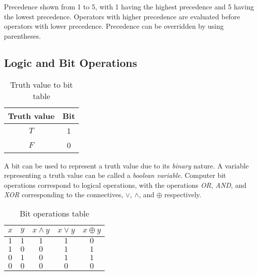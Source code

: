 \documentclass[12pt letter]{report}
\begin{document}
Precedence shown from 1 to 5, with 1 having the highest precedence and 5 having the lowest precedence. Operators with
higher precedence are evaluated before operators with lower precedence. Precedence can be overridden by using parentheses.

\subsection{Logic and Bit Operations}


\begin{table}[h!]
	\caption{Truth value to bit table}\label{tab:bit}
	\begin{center}
		\begin{tabular}{|c|c|}
			\hline
			Truth value & Bit \\ [0.5ex]
			\hline
			\hline
			$T$         & 1   \\
			$F$         & 0   \\
			\hline
		\end{tabular}
	\end{center}
\end{table}

A bit can be used to represent a truth value due to its \textit{binary} nature. A variable representing a truth value
can be called a \textit{boolean variable}. Computer bit operations correspond to logical operations, with the operations
\textit{OR}, \textit{AND}, and \textit{XOR} corresponding to the connectives, $\vee$, $\wedge$, and $\oplus$ respectively.

\begin{table}[h!]
	\caption{Bit operations table}\label{tab:ops}
	\begin{center}
		\begin{tabular}{|c|c|c|c|c|}
			\hline
			$x$ & $y$ & $x \wedge y$ & $x \vee y$ & $x \oplus y$ \\ [0.5ex]
			\hline
			\hline
			$1$ & $1$ & $1$          & $1$        & $0$          \\
			$1$ & $0$ & $0$          & $1$        & $1$          \\
			$0$ & $1$ & $0$          & $1$        & $1$          \\
			$0$ & $0$ & $0$          & $0$        & $0$          \\
			\hline
		\end{tabular}
	\end{center}
\end{table}

\end{document}
